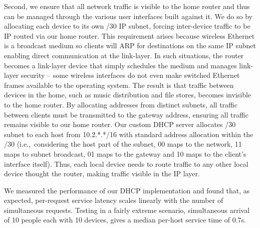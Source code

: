 Second, we ensure that all network traffic is visible to the home router and
thus can be managed through the various user interfaces built against it.  We do
so by allocating each device to its own /30 IP subnet, forcing inter-device
traffic to be IP routed via our home router.  This requirement arises because
wireless Ethernet is a broadcast medium so clients will ARP for destinations on
the same IP subnet enabling direct communication at the link-layer.  In such
situations, the router becomes a link-layer device that simply schedules the
medium and manages link-layer security -- some wireless interfaces do not even
make switched Ethernet frames available to the operating system. The result
is that traffic between devices in the
home, such as music distribution and file stores, becomes invisible to the
home router.  By allocating addresses from distinct subnets, all traffic
between clients must be transmitted to the gateway address, ensuring all
traffic remains visible to our home router. 
Our custom DHCP server allocates /30 subnet to each host from 10.2.*.*/16 with
standard address allocation within the /30 (i.e.,~considering the host part of
the subnet, 00 maps to the network, 11 maps to subnet broadcast, 01 maps to the
gateway and 10 maps to the client's interface itself). Thus, each local device
needs to route traffic to any other local device thought the router, making
traffic visible in the IP layer.
%

We measured the performance of our DHCP implementation and found that, as
expected, per-request service latency scales linearly with the number of
simultaneous requests.  Testing in a fairly extreme scenario, simultaneous
arrival of 10 people each with 10 devices,  gives a median per-host service time
of 0.7s.

